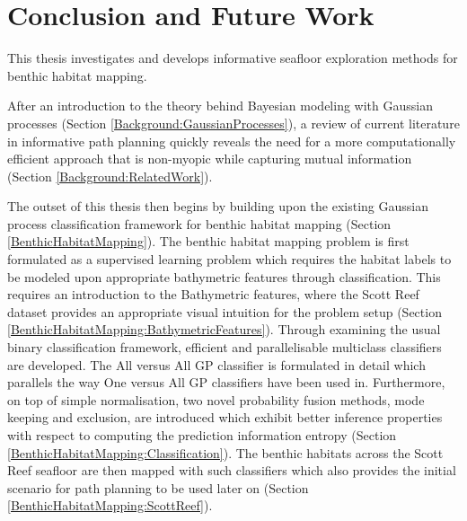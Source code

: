 \chapter{Conclusion and Future Work}
\label{Conclusion}

	This thesis investigates and develops informative seafloor exploration methods for benthic habitat mapping.
	
	After an introduction to the theory behind Bayesian modeling with Gaussian processes (Section \ref{Background:GaussianProcesses}), a review of current literature in informative path planning quickly reveals the need for a more computationally efficient approach that is non-myopic while capturing mutual information (Section \ref{Background:RelatedWork}).
	
	The outset of this thesis then begins by building upon the existing Gaussian process classification framework for benthic habitat mapping (Section \ref{BenthicHabitatMapping}). The benthic habitat mapping problem is first formulated as a supervised learning problem which requires the habitat labels to be modeled upon appropriate bathymetric features through classification. This requires an introduction to the Bathymetric features, where the Scott Reef dataset provides an appropriate visual intuition for the problem setup (Section \ref{BenthicHabitatMapping:BathymetricFeatures}). Through examining the usual binary classification framework, efficient and parallelisable multiclass classifiers are developed. The All versus All GP classifier is formulated in detail which parallels the way One versus All GP classifiers have been used in. Furthermore, on top of simple normalisation, two novel probability fusion methods, mode keeping and exclusion, are introduced which exhibit better inference properties with respect to computing the prediction information entropy (Section \ref{BenthicHabitatMapping:Classification}). The benthic habitats across the Scott Reef seafloor are then mapped with such classifiers which also provides the initial scenario for path planning to be used later on (Section \ref{BenthicHabitatMapping:ScottReef}).
	
